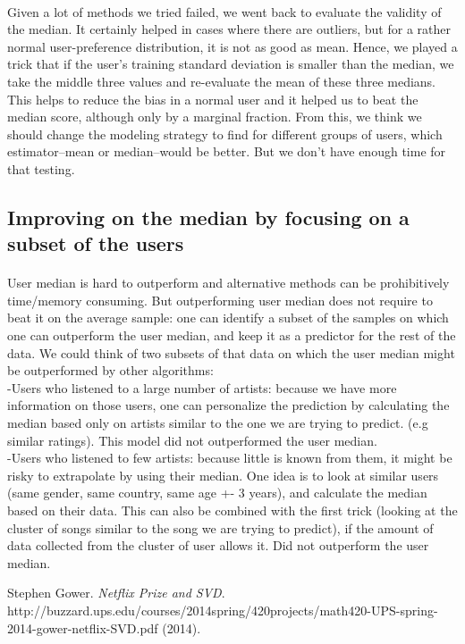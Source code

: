 \documentclass[11pt]{article}
\begin{document}
\paragraph{}
Given a lot of methods we tried failed, we went back to evaluate the validity of the median. It certainly helped in cases where there are outliers, but for a rather normal user-preference distribution, it is not as good as mean. Hence, we played a trick that if the user's training standard deviation is smaller than the median, we take the middle three values and re-evaluate the mean of these three medians. This helps to reduce the bias in a normal user and it helped us to beat the median score, although only by a marginal fraction. From this, we think we should change the modeling strategy to find for different groups of users, which estimator--mean or median--would be better. But we don't have enough time for that testing.

\subsection{Improving on the median by focusing on a subset of the users}
\paragraph{}
User median is hard to outperform and alternative methods can be prohibitively time/memory consuming. But outperforming user median does not require to beat it on the average sample: one can identify a subset of the samples on which one can outperform the user median, and keep it as a predictor for the rest of the data. We could think of two subsets of that data on which the user median might be outperformed by other algorithms:\\
-Users who listened to a large number of artists: because we have more information on those users, one can personalize the prediction by calculating the median based only on artists similar to the one we are trying to predict. (e.g similar ratings). This model did not outperformed the user median.\\
-Users who listened to few artists: because little is known from them, it might be risky to extrapolate by using their median. One idea is to look at similar users (same gender, same country, same age +- 3 years), and calculate the median based on their data. This can also be combined with the first trick (looking at the cluster of songs similar to the song we are trying to predict), if the amount of data collected from the cluster of user allows it. Did not outperform the user median.\\

 \begin{thebibliography}{1}

   Stephen Gower. {\em Netflix Prize and SVD}. http://buzzard.ups.edu/courses/2014spring/420projects/math420-UPS-spring-2014-gower-netflix-SVD.pdf (2014).

  \end{thebibliography}
\end{document}

